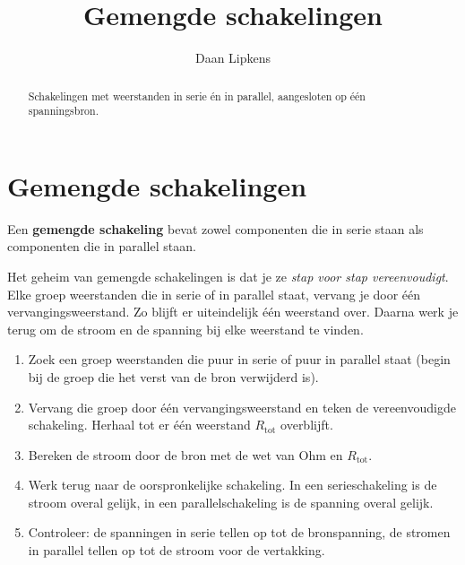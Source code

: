 \documentclass{ximera}
\title{Gemengde schakelingen}
\author{Daan Lipkens}
\begin{document}
\begin{abstract}
    Schakelingen met weerstanden in serie én in parallel, aangesloten op één spanningsbron.
\end{abstract}
\maketitle
\label{ond:schakelingen_gemengd}

\section{Gemengde schakelingen}\label{sec:gemengde-schakeling}
\begin{definition}[title={Gemengde schakeling}]\nl
    Een \textbf{gemengde schakeling} bevat zowel componenten die in serie staan als componenten die in parallel staan.
\end{definition}

Het geheim van gemengde schakelingen is dat je ze \emph{stap voor stap vereenvoudigt}. Elke groep weerstanden die in serie of in parallel staat, vervang je door één vervangingsweerstand. Zo blijft er uiteindelijk één weerstand over. Daarna werk je terug om de stroom en de spanning bij elke weerstand te vinden.

\begin{remark}[title={Stappenplan gemengde schakeling}]\nl
    \begin{enumerate}
        \item Zoek een groep weerstanden die puur in serie of puur in parallel staat (begin bij de groep die het verst van de bron verwijderd is).
        \item Vervang die groep door één vervangingsweerstand en teken de vereenvoudigde schakeling. Herhaal tot er één weerstand $R_{\text{tot}}$ overblijft.
        \item Bereken de stroom door de bron met de wet van Ohm en $R_{\text{tot}}$.
        \item Werk terug naar de oorspronkelijke schakeling. In een serieschakeling is de stroom overal gelijk, in een parallelschakeling is de spanning overal gelijk.
        \item Controleer: de spanningen in serie tellen op tot de bronspanning, de stromen in parallel tellen op tot de stroom voor de vertakking.
    \end{enumerate}
\end{remark}
\end{document}
